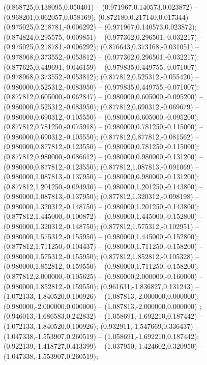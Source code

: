  (0.868725,0.138095,0.050401) -- (0.971967,0.140573,0.023872) -- (0.968201,0.062057,0.058169);
 (0.872180,0.217140,0.017344) -- (0.975025,0.218781,-0.006292) -- (0.971967,0.140573,0.023872);
 (0.874824,0.295575,-0.009851) -- (0.977362,0.296501,-0.032217) -- (0.975025,0.218781,-0.006292);
 (0.876643,0.373168,-0.031051) -- (0.978968,0.373552,-0.053812) -- (0.977362,0.296501,-0.032217);
 (0.877625,0.449691,-0.046159) -- (0.979835,0.449755,-0.071007) -- (0.978968,0.373552,-0.053812);
 (0.877812,0.525312,-0.055420) -- (0.980000,0.525312,-0.083950) -- (0.979835,0.449755,-0.071007);
 (0.877812,0.605000,-0.062847) -- (0.980000,0.605000,-0.095200) -- (0.980000,0.525312,-0.083950);
 (0.877812,0.690312,-0.069679) -- (0.980000,0.690312,-0.105550) -- (0.980000,0.605000,-0.095200);
 (0.877812,0.781250,-0.075918) -- (0.980000,0.781250,-0.115000) -- (0.980000,0.690312,-0.105550);
 (0.877812,0.877812,-0.081562) -- (0.980000,0.877812,-0.123550) -- (0.980000,0.781250,-0.115000);
 (0.877812,0.980000,-0.086612) -- (0.980000,0.980000,-0.131200) -- (0.980000,0.877812,-0.123550);
 (0.877812,1.087813,-0.091069) -- (0.980000,1.087813,-0.137950) -- (0.980000,0.980000,-0.131200);
 (0.877812,1.201250,-0.094930) -- (0.980000,1.201250,-0.143800) -- (0.980000,1.087813,-0.137950);
 (0.877812,1.320312,-0.098198) -- (0.980000,1.320312,-0.148750) -- (0.980000,1.201250,-0.143800);
 (0.877812,1.445000,-0.100872) -- (0.980000,1.445000,-0.152800) -- (0.980000,1.320312,-0.148750);
 (0.877812,1.575312,-0.102951) -- (0.980000,1.575312,-0.155950) -- (0.980000,1.445000,-0.152800);
 (0.877812,1.711250,-0.104437) -- (0.980000,1.711250,-0.158200) -- (0.980000,1.575312,-0.155950);
 (0.877812,1.852812,-0.105328) -- (0.980000,1.852812,-0.159550) -- (0.980000,1.711250,-0.158200);
 (0.877812,2.000000,-0.105625) -- (0.980000,2.000000,-0.160000) -- (0.980000,1.852812,-0.159550);
 (0.961631,-1.836827,0.131243) -- (1.072133,-1.840520,0.100926) -- (1.087813,-2.000000,0.000000);
 (0.980000,-2.000000,0.000000) -- (1.087813,-2.000000,0.000000) ;
 (0.946013,-1.686583,0.242832) -- (1.058691,-1.692210,0.187442) -- (1.072133,-1.840520,0.100926);
 (0.932911,-1.547669,0.336437) -- (1.047338,-1.553907,0.260519) -- (1.058691,-1.692210,0.187442);
 (0.922139,-1.418727,0.413399) -- (1.037950,-1.424602,0.320950) -- (1.047338,-1.553907,0.260519);
